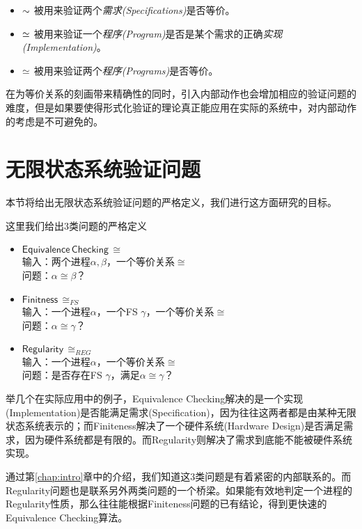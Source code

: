 \begin{itemize}
    \item $\sim$ 被用来验证两个\emph{需求(Specifications)}是否等价。
    \item $\simeq$ 被用来验证一个\emph{程序(Program)}是否是某个需求的正确\emph{实现(Implementation)}。
    \item $\simeq$ 被用来验证两个\emph{程序(Programs)}是否等价。
\end{itemize}

在为等价关系的刻画带来精确性的同时，引入内部动作也会增加相应的验证问题的难度，但是如果要使得形式化验证的理论真正能应用在实际的系统中，对内部动作的考虑是不可避免的。


\section{无限状态系统验证问题}
\label{sec:verfication}

本节将给出无限状态系统验证问题的严格定义，我们进行这方面研究的目标。
\begin{defn}[问题定义]\label{def:prob}
这里我们给出3类问题的严格定义
\begin{itemize}	
	\item $\mathsf{Equivalence\,Checking}\,\cong$\\
	输入：两个进程$\alpha,\beta$，一个等价关系$\cong$\\
	问题：$\alpha\cong\beta$？	
	\item $\mathsf{Finitness}\,\cong_{FS}$\\
	输入：一个进程$\alpha$，一个FS $\gamma$，一个等价关系$\cong$\\
	问题：$\alpha\cong\gamma$？
	\item $\mathsf{Regularity}\,\cong_{REG}$\\
	输入：一个进程$\alpha$，一个等价关系$\cong$\\
	问题：是否存在FS $\gamma$，满足$\alpha\cong\gamma$？
\end{itemize}
\end{defn}

举几个在实际应用中的例子，Equivalence Checking解决的是一个实现(Implementation)是否能满足需求(Specification)，因为往往这两者都是由某种无限状态系统表示的；而Finiteness解决了一个硬件系统(Hardware Design)是否满足需求，因为硬件系统都是有限的。而Regularity则解决了需求到底能不能被硬件系统实现。

通过第\ref{chap:intro}章中的介绍，我们知道这3类问题是有着紧密的内部联系的。而Regularity问题也是联系另外两类问题的一个桥梁。如果能有效地判定一个进程的Regularity性质，那么往往能根据Finiteness问题的已有结论，得到更快速的Equivalence Checking算法。

